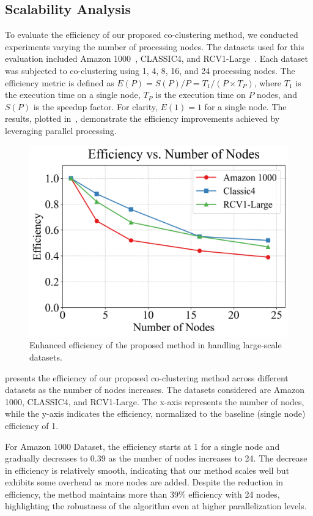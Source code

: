 \documentclass[journal]{IEEEtran}
\renewcommand{\cite}[1]{~\autocite{#1}}
\begin{document}
\subsection{Scalability Analysis}
To evaluate the efficiency of our proposed co-clustering method, we conducted experiments varying the number of processing nodes. The datasets used for this evaluation included Amazon 1000\cite{ni2019JustifyingRecommendationsUsing}, CLASSIC4, and RCV1-Large\cite{lewis2004Rcv1NewBenchmark}. Each dataset was subjected to co-clustering using 1, 4, 8, 16, and 24 processing nodes. {\color{blue}The efficiency metric is defined as $E(P) = S(P)/P = T_1/(P \times T_P)$, where $T_1$ is the execution time on a single node, $T_P$ is the execution time on $P$ nodes, and $S(P)$ is the speedup factor. For clarity, $E(1) = 1$ for a single node.} The results, plotted in~, demonstrate the efficiency improvements achieved by leveraging parallel processing.

\begin{figure}[htbp]
    \centering
    \includegraphics[width=0.8\linewidth]{efficiency.png}
    \caption{Enhanced efficiency of the proposed method in handling large-scale datasets.}
    \label{fig:efficiency}
\end{figure}

 presents the efficiency of our proposed co-clustering method across different datasets as the number of nodes increases. The datasets considered are Amazon 1000, CLASSIC4, and RCV1-Large. The x-axis represents the number of nodes, while the y-axis indicates the efficiency, normalized to the baseline (single node) efficiency of 1.

For Amazon 1000 Dataset, the efficiency starts at 1 for a single node and gradually decreases to 0.39 as the number of nodes increases to 24. The decrease in efficiency is relatively smooth, indicating that our method scales well but exhibits some overhead as more nodes are added. Despite the reduction in efficiency, the method maintains more than 39\% efficiency with 24 nodes, highlighting the robustness of the algorithm even at higher parallelization levels.
\end{document}
